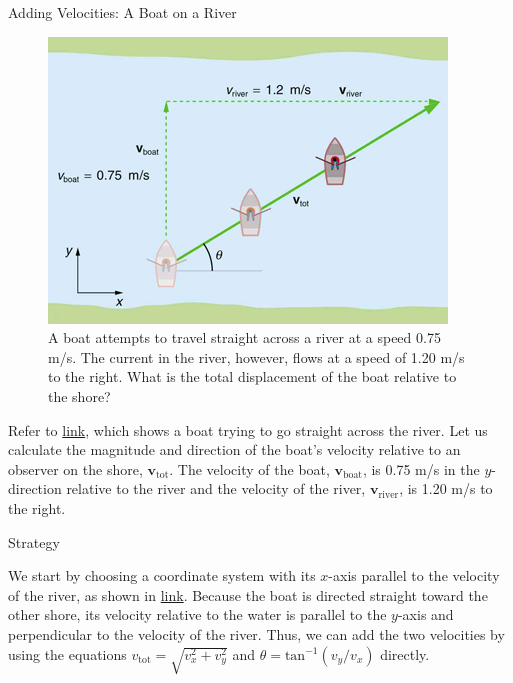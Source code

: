 \documentclass[
]{book}
\newenvironment{tinysection}{}{}
\begin{document}
\hypertarget{fs-id1076781}{}
Adding Velocities: A Boat on a River

\begin{figure}
\hypertarget{import-auto-id2070798}{%
\centering
\includegraphics{images/Figure_03_05_09a.jpg}
\caption{A boat attempts to travel straight across a river at a speed 0.75 m/s.
The current in the river, however, flows at a speed of 1.20 m/s to the
right. What is the total displacement of the boat relative to the
shore?}\label{import-auto-id2070798}
}
\end{figure}

Refer to \protect\hyperlink{import-auto-id2070798}{link}, which
shows a boat trying to go straight across the river. Let us calculate
the magnitude and direction of the boat's velocity relative to an
observer on the shore, \(\textbf{v}_{\text{tot}}{}\). The velocity of the
boat, \(\textbf{v}_{\text{boat}}{}\), is 0.75 m/s in the \(y{}\)-direction
relative to the river and the velocity of the river,
\(\textbf{v}_{\text{river}}{}\), is 1.20 m/s to the right.

\begin{tinysection}

{Strategy}

\end{tinysection}

We start by choosing a coordinate system with its \(x\)-axis parallel to
the velocity of the river, as shown in
\protect\hyperlink{import-auto-id2070798}{link}. Because the boat
is directed straight toward the other shore, its velocity relative to
the water is parallel to the \(y\)-axis and perpendicular to the velocity
of the river. Thus, we can add the two velocities by using the equations
\({v_{\text{tot}} = \sqrt{v_{x}^{2} + v_{y}^{2}}}{}\) and
\({{\theta = \text{tan}^{- 1}}({v_{y}/v_{x}})}{}\) directly.
\end{document}
